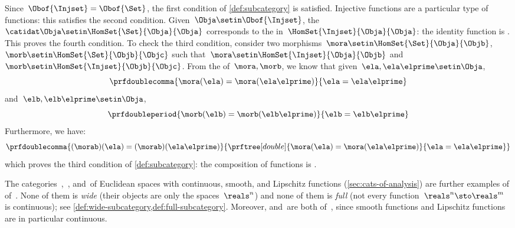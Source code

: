 {\begin{example}
    Since~$\Obof{\Injset}=\Obof{\Set}$, the first condition of \cref{def:subcategory} is satisfied.
    Injective functions are a particular type of functions: this satisfies the second condition.
    Given~$\Obja\setin \Obof{\Injset}$, the ~$\catidat\Obja\setin \HomSet{\Set}{\Obja}{\Obja}$ corresponds to the  in~$\HomSet{\Injset}{\Obja}{\Obja}$: the identity function is .
    This proves the fourth condition.
    To check the third condition, consider two morphisms~$\mora \setin \HomSet{\Set}{\Obja}{\Objb}$,~$\morb \setin \HomSet{\Set}{\Objb}{\Objc}$ such that~$\mora \setin \HomSet{\Injset}{\Obja}{\Objb}$ and~$\morb\setin \HomSet{\Injset}{\Objb}{\Objc}$.
    From the  of~$\mora,\morb$, we know that given~$\ela,\ela\elprime\setin \Obja$,
    \begin{equation}
        \prfdoublecomma{
            \mora(\ela)=\mora(\ela\elprime)
        }{
            \ela=\ela\elprime
        }
    \end{equation}
    and~$\elb,\elb\elprime\setin \Obja$,
    \begin{equation}
        \prfdoubleperiod{
            \morb(\elb)=\morb(\elb\elprime)
        }{
            \elb=\elb\elprime
        }
    \end{equation}
    Furthermore, we have:
    \begin{equation}
        \prfdoublecomma{
            (\morab)(\ela)
            =(\morab)(\ela\elprime)
        }{
            \prftree[double]{
                \mora(\ela)=\mora(\ela\elprime)
            }{
                \ela=\ela\elprime
            }
        }
    \end{equation}
    which proves the third condition of \cref{def:subcategory}: the composition of  functions is .
\end{example}

\begin{remark}
    \label{rem:analysis-subcategories}
    The categories~\Cont,~\Smooth, and~\Lip of Euclidean spaces with continuous, smooth, and Lipschitz functions (\cref{sec:cats-of-analysis}) are further examples of  of~\Set.
    None of them is \emph{wide} (their objects are only the spaces~$\reals^n$) and none of them is \emph{full} (not every function~$\reals^n \sto \reals^m$ is continuous); see \cref{def:wide-subcategory,def:full-subcategory}.
    Moreover, \Smooth and~\Lip are both  of~\Cont, since smooth functions and Lipschitz functions are in particular continuous.
\end{remark}

}




